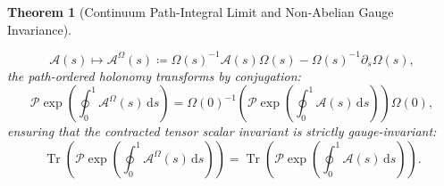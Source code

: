 \documentclass[11pt,a4paper,reqno]{amsart}
\newtheorem{theorem}{Theorem}[section]
\theoremstyle{definition}
\numberwithin{equation}{section}
\newcommand{\Tr}{\operatorname{Tr}}
\newcommand{\dif}{\,\mathrm{d}}
\begin{document}
\begin{theorem}[Continuum Path-Integral Limit and Non-Abelian Gauge Invariance]
\begin{enumerate}[label=(\roman*)]
\begin{equation}
        \mathcal{A}(s) \mapsto \mathcal{A}^\Omega(s) \coloneqq \Omega(s)^{-1} \mathcal{A}(s) \Omega(s) - \Omega(s)^{-1} \partial_s \Omega(s),
    \end{equation}
    the path-ordered holonomy transforms by conjugation:
    \begin{equation}
        \mathcal{P} \exp\left( \oint_0^1 \mathcal{A}^\Omega(s) \dif s \right) = \Omega(0)^{-1} \left( \mathcal{P} \exp\left( \oint_0^1 \mathcal{A}(s) \dif s \right) \right) \Omega(0),
    \end{equation}
    ensuring that the contracted tensor scalar invariant is strictly gauge-invariant:
    \begin{equation}
        \Tr\left( \mathcal{P} \exp\left( \oint_0^1 \mathcal{A}^\Omega(s) \dif s \right) \right) = \Tr\left( \mathcal{P} \exp\left( \oint_0^1 \mathcal{A}(s) \dif s \right) \right).
    \end{equation}
\end{enumerate}
\end{theorem}
\end{document}
